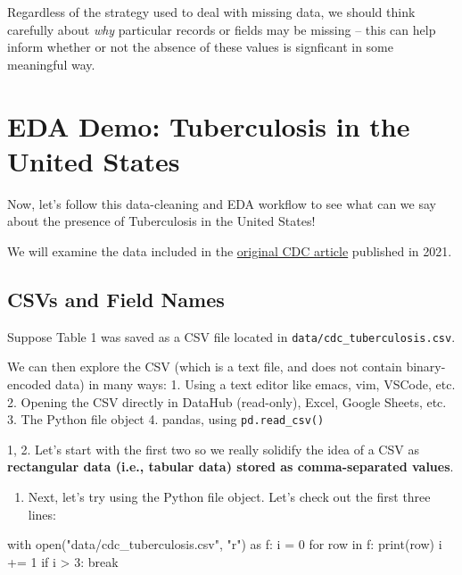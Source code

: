 \documentclass[
  letterpaper,
  DIV=11,
  numbers=noendperiod]{scrreprt}
\newenvironment{Shaded}{\begin{snugshade}}{\end{snugshade}}
\newcommand{\BuiltInTok}[1]{\textcolor[rgb]{0.00,0.23,0.31}{#1}}
\newcommand{\ControlFlowTok}[1]{\textcolor[rgb]{0.00,0.23,0.31}{#1}}
\newcommand{\DecValTok}[1]{\textcolor[rgb]{0.68,0.00,0.00}{#1}}
\newcommand{\ImportTok}[1]{\textcolor[rgb]{0.00,0.46,0.62}{#1}}
\newcommand{\KeywordTok}[1]{\textcolor[rgb]{0.00,0.23,0.31}{#1}}
\newcommand{\NormalTok}[1]{\textcolor[rgb]{0.00,0.23,0.31}{#1}}
\newcommand{\OperatorTok}[1]{\textcolor[rgb]{0.37,0.37,0.37}{#1}}
\newcommand{\StringTok}[1]{\textcolor[rgb]{0.13,0.47,0.30}{#1}}
\providecommand{\tightlist}{%
  \setlength{\itemsep}{0pt}\setlength{\parskip}{0pt}}\usepackage{longtable,booktabs,array}
\begin{document}
Regardless of the strategy used to deal with missing data, we should
think carefully about \emph{why} particular records or fields may be
missing -- this can help inform whether or not the absence of these
values is signficant in some meaningful way.


\hypertarget{eda-demo-tuberculosis-in-the-united-states}{%
\chapter{EDA Demo: Tuberculosis in the United
States}\label{eda-demo-tuberculosis-in-the-united-states}}

Now, let's follow this data-cleaning and EDA workflow to see what can we
say about the presence of Tuberculosis in the United States!

We will examine the data included in the
\href{https://www.cdc.gov/mmwr/volumes/71/wr/mm7112a1.htm?s_cid=mm7112a1_w\#T1_down}{original
CDC article} published in 2021.

\hypertarget{csvs-and-field-names}{%
\section{CSVs and Field Names}\label{csvs-and-field-names}}

Suppose Table 1 was saved as a CSV file located in
\texttt{data/cdc\_tuberculosis.csv}.

We can then explore the CSV (which is a text file, and does not contain
binary-encoded data) in many ways: 1. Using a text editor like emacs,
vim, VSCode, etc. 2. Opening the CSV directly in DataHub (read-only),
Excel, Google Sheets, etc. 3. The Python file object 4. pandas, using
\texttt{pd.read\_csv()}

1, 2. Let's start with the first two so we really solidify the idea of a
CSV as \textbf{rectangular data (i.e., tabular data) stored as
comma-separated values}.

\begin{enumerate}
\def\labelenumi{\arabic{enumi}.}
\setcounter{enumi}{2}
\tightlist
\item
  Next, let's try using the Python file object. Let's check out the
  first three lines:
\end{enumerate}

\begin{Shaded}
\begin{Highlighting}[]
\ControlFlowTok{with} \BuiltInTok{open}\NormalTok{(}\StringTok{"data/cdc\_tuberculosis.csv"}\NormalTok{, }\StringTok{"r"}\NormalTok{) }\ImportTok{as}\NormalTok{ f:}
\NormalTok{    i }\OperatorTok{=} \DecValTok{0}
    \ControlFlowTok{for}\NormalTok{ row }\KeywordTok{in}\NormalTok{ f:}
        \BuiltInTok{print}\NormalTok{(row)}
\NormalTok{        i }\OperatorTok{+=} \DecValTok{1}
        \ControlFlowTok{if}\NormalTok{ i }\OperatorTok{\textgreater{}} \DecValTok{3}\NormalTok{:}
            \ControlFlowTok{break}
\end{Highlighting}
\end{Shaded}
\end{document}
